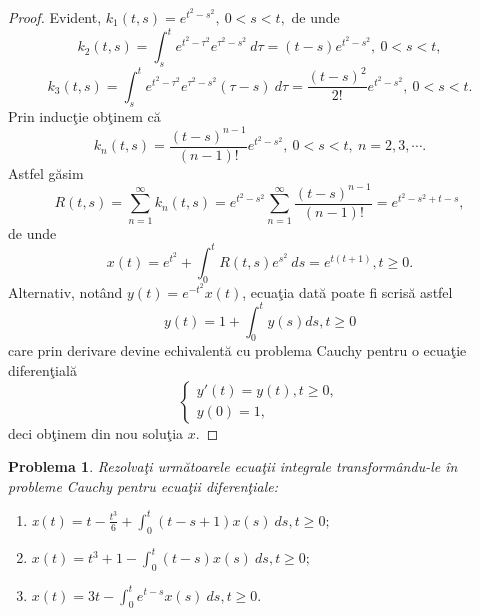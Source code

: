 \documentclass[a4paper,12pt,oneside]{report}
\newtheorem{problem}{Problema}
\begin{document}
\begin{proof}
 Evident, $k_1(t, s)=e^{t^{2} - s^{2}},~0<s<t,$ de unde
 \[
 k_2(t, s)=\int_s^t e^{t^{2} - \tau^{2}}e^{\tau^{2} - s^{2}} ~d\tau=(t-s)e^{t^{2} - s^{2}},    ~0<s<t,
 \]
  \[
 k_3(t, s)=\int_s^t e^{t^{2} - \tau^{2}}e^{\tau^{2} - s^{2}}(\tau-s) ~d\tau=\frac{(t-s)^2}{2!}e^{t^{2} - s^{2}},    ~0<s<t.
 \]
 Prin induc\c{t}ie ob\c{t}inem c\u{a}
 \[
 k_n(t, s)=\frac{(t-s)^{n-1}}{(n-1)!}e^{t^{2} - s^{2}},    ~0<s<t,~n=2, 3,\cdots.
 \]    			      			      			      	
Astfel g\u{a}sim
\begin{displaymath}
R \left ( t,s \right ) =\sum_{n=1}^\infty  k_n(t, s)=e^{t^{2}- s^{2}} \sum_{n=1}^\infty \frac{(t-s)^{n-1}}{(n-1)!} = e^{t^{2}- s^{2} + t - s },
\end{displaymath}
de unde
\[
x\left ( t \right )= e^{t^{2}}+\int_0^t R(t, s) e^{s^{2}}~ds= e^{t\left ( t+1 \right )}, t\geq 0.
\]
Alternativ, not\^{a}nd \(y\left ( t \right ) = e^{-t^{2}}x\left ( t \right ) \), ecua\c{t}ia dat\u{a} poate fi scris\u{a} astfel
\begin{displaymath}
y\left ( t \right ) = 1 + \int_{0}^{t} y\left ( s \right )ds, t\geq 0
\end{displaymath}
care prin derivare devine echivalent\u{a} cu problema Cauchy pentru o ecua\c{t}ie diferen\c{t}ial\u{a}
\begin{displaymath}
\left\{\begin{matrix}
{y}'\left ( t \right ) = y\left ( t \right ), t\geq 0, \\
y\left ( 0 \right ) = 1,
\end{matrix}\right.
\end{displaymath}
deci ob\c{t}inem din nou solu\c{t}ia \(x\).

\end{proof} 	      			      			      			      			      	
\begin{problem}
Rezolva\c{t}i urm\u{a}toarele ecua\c{t}ii integrale transform\^{a}ndu-le \^{i}n probleme Cauchy pentru ecua\c{t}ii diferen\c{t}iale:
\begin{enumerate}[label=(\alph*)]
\item x\(\left ( t \right ) =  t - \frac{t^{3}}{6} + \int_{0}^{t}\left ( t-s+1 \right )x\left ( s \right ) \ ds , t\geq 0;\)
\item \(x\left ( t \right ) =  t^{3} + 1 - \int_{0}^{t}\left ( t-s \right )x\left ( s \right ) \ ds , t\geq 0;\)
\item \(x\left ( t \right ) =  3t - \int_{0}^{t}e^{t-s}x\left ( s \right ) \ ds , t\geq 0.\)
\end{enumerate}
\end{problem}
\end{document}
